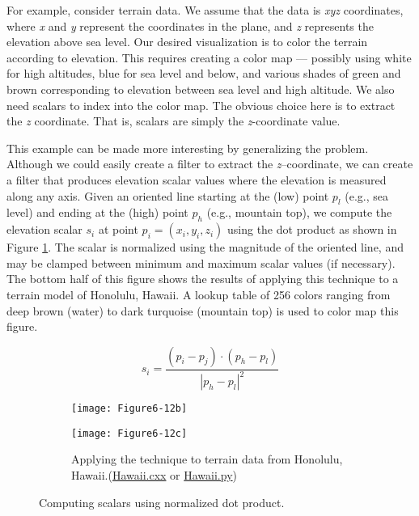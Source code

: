 For example, consider terrain data. We assume that the data is \emph{xyz} coordinates, where \emph{x} and \emph{y} represent the coordinates in the plane, and \emph{z} represents the elevation above sea level. Our desired visualization is to color the terrain according to elevation. This requires creating a color map --- possibly using white for high altitudes, blue for sea level and below, and various shades of green and brown corresponding to elevation between sea level and high altitude. We also need scalars to index into the color map. The obvious choice here is to extract the \emph{z} coordinate. That is, scalars are simply the \emph{z}-coordinate value.

This example can be made more interesting by generalizing the problem. Although we could easily create a filter to extract the \emph{z}--coordinate, we can create a filter that produces elevation scalar values where the elevation is measured along any axis. Given an oriented line starting at the (low) point $p_l$ (e.g., sea level) and ending at the (high) point $p_h$ (e.g., mountain top), we compute the elevation scalar $s_i$ at point $p_i = (x_i, y_i,z_i)$ using the dot product as shown in Figure \ref{fig:Figure6-12}. The scalar is normalized using the magnitude of the oriented line, and may be clamped between minimum and maximum scalar values (if necessary). The bottom half of this figure shows the results of applying this technique to a terrain model of Honolulu, Hawaii. A lookup table of 256 colors ranging from deep brown (water) to dark turquoise (mountain top) is used to color map this figure.

\begin{figure}[htb]
	\begin{subfigure}[h]{0.48\linewidth}
		\begin{equation*}
			s_i = \frac{(p_i-p_j) \cdot (p_h-p_l)}{|p_h-p_l|^2}
		\end{equation*}
	\end{subfigure}
	\begin{subfigure}[h]{0.48\linewidth}
	\texttt{[image: Figure6-12b]}
	\end{subfigure}
	\hfill
	\begin{subfigure}[h]{0.48\linewidth}
		\texttt{[image: Figure6-12c]}
		\caption*{Applying the technique to terrain data from Honolulu, Hawaii.(\href{https://lorensen.github.io/VTKExamples/site/Cxx/Visualization/Hawaii}{Hawaii.cxx} or \href{https://lorensen.github.io/VTKExamples/site/Python/Visualization/Hawaii/}{Hawaii.py})}
	\end{subfigure}%
	\caption{Computing scalars using normalized dot product.}\label{fig:Figure6-12}
\end{figure}

